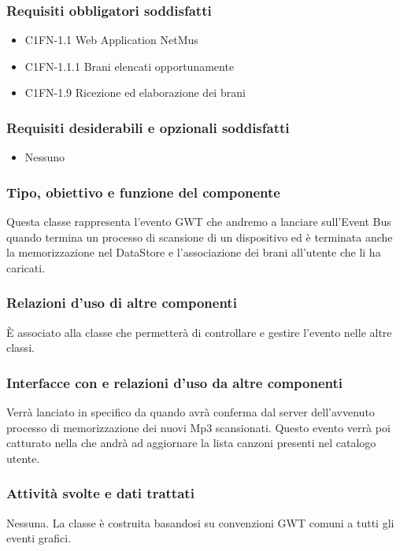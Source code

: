 \subsubsection*{Requisiti obbligatori soddisfatti}
\begin{itemize}
    \item C1FN-1.1 Web Application NetMus
    \item C1FN-1.1.1 Brani elencati opportunamente
    \item C1FN-1.9 Ricezione ed elaborazione dei brani
\end{itemize}
\subsubsection*{Requisiti desiderabili e opzionali soddisfatti}
\begin{itemize}
    \item Nessuno
\end{itemize}
\subsubsection*{Tipo, obiettivo e funzione del componente}
Questa classe rappresenta l'evento GWT che andremo a lanciare sull'Event Bus
quando termina un processo di scansione di un dispositivo ed \`e terminata
anche la memorizzazione nel DataStore e l'associazione dei brani all'utente che
li ha caricati. 
\subsubsection*{Relazioni d'uso di altre componenti}
\`E associato alla classe  che permetter\`a di
controllare e gestire l'evento nelle altre classi.
\subsubsection*{Interfacce con e relazioni d'uso da altre componenti}
Verr\`a lanciato in specifico da  quando avr\`a conferma dal
server dell'avvenuto processo di memorizzazione dei nuovi Mp3 scansionati. Questo
evento verr\`a poi catturato nella  che andr\`a ad
aggiornare la lista canzoni presenti nel catalogo utente.
\subsubsection*{Attivit\`a svolte e dati trattati}
Nessuna. La classe \`e costruita basandosi su convenzioni GWT comuni a tutti gli
eventi grafici.

